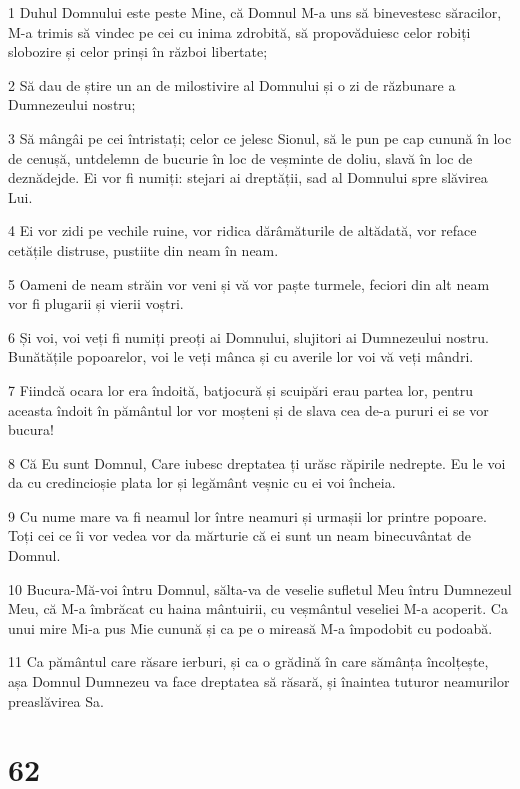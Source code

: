 \par 1 Duhul Domnului este peste Mine, că Domnul M-a uns să binevestesc săracilor, M-a trimis să vindec pe cei cu inima zdrobită, să propovăduiesc celor robiți slobozire și celor prinși în război libertate;
\par 2 Să dau de știre un an de milostivire al Domnului și o zi de răzbunare a Dumnezeului nostru;
\par 3 Să mângâi pe cei întristați; celor ce jelesc Sionul, să le pun pe cap cunună în loc de cenușă, untdelemn de bucurie în loc de veșminte de doliu, slavă în loc de deznădejde. Ei vor fi numiți: stejari ai dreptății, sad al Domnului spre slăvirea Lui.
\par 4 Ei vor zidi pe vechile ruine, vor ridica dărâmăturile de altădată, vor reface cetățile distruse, pustiite din neam în neam.
\par 5 Oameni de neam străin vor veni și vă vor paște turmele, feciori din alt neam vor fi plugarii și vierii voștri.
\par 6 Și voi, voi veți fi numiți preoți ai Domnului, slujitori ai Dumnezeului nostru. Bunătățile popoarelor, voi le veți mânca și cu averile lor voi vă veți mândri.
\par 7 Fiindcă ocara lor era îndoită, batjocură și scuipări erau partea lor, pentru aceasta îndoit în pământul lor vor moșteni și de slava cea de-a pururi ei se vor bucura!
\par 8 Că Eu sunt Domnul, Care iubesc dreptatea ți urăsc răpirile nedrepte. Eu le voi da cu credincioșie plata lor și legământ veșnic cu ei voi încheia.
\par 9 Cu nume mare va fi neamul lor între neamuri și urmașii lor printre popoare. Toți cei ce îi vor vedea vor da mărturie că ei sunt un neam binecuvântat de Domnul.
\par 10 Bucura-Mă-voi întru Domnul, sălta-va de veselie sufletul Meu întru Dumnezeul Meu, că M-a îmbrăcat cu haina mântuirii, cu veșmântul veseliei M-a acoperit. Ca unui mire Mi-a pus Mie cunună și ca pe o mireasă M-a împodobit cu podoabă.
\par 11 Ca pământul care răsare ierburi, și ca o grădină în care sămânța încolțește, așa Domnul Dumnezeu va face dreptatea să răsară, și înaintea tuturor neamurilor preaslăvirea Sa.

\chapter{62}

